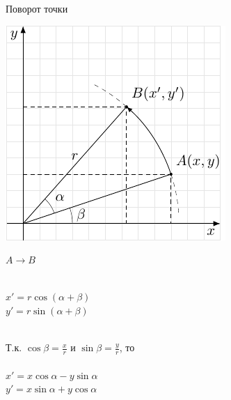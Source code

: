\documentclass[10pt]{beamer}
\begin{document}
    \begin{frame}{Поворот точки}
    	
    	{
    		\includegraphics[width=\textwidth]{rotate.pdf}
    	}
    	{
    		
    		$A \rightarrow B$ \\ ~ \\
    		
    		\pause
    		
    		$x'=r\cos (\alpha+\beta)$ \onslide<3->{ $=r(\cos\alpha \cos\beta-\sin\alpha \sin\beta)$}  \\
    		$y'=r\sin (\alpha+\beta)$  \\~\\
    		
    		\pause[4] 
    		
    		Т.к. $\displaystyle \cos\beta = \frac{x}{r}$ и $\displaystyle\sin\beta=\frac{y}{r}$, то \\ ~ \\
    		
    		$x'=x\cos\alpha-y\sin\alpha$ \\
    		$y'=x\sin\alpha+y\cos\alpha$
    		
    		\pause
    		
}
\end{frame}
\end{document}
